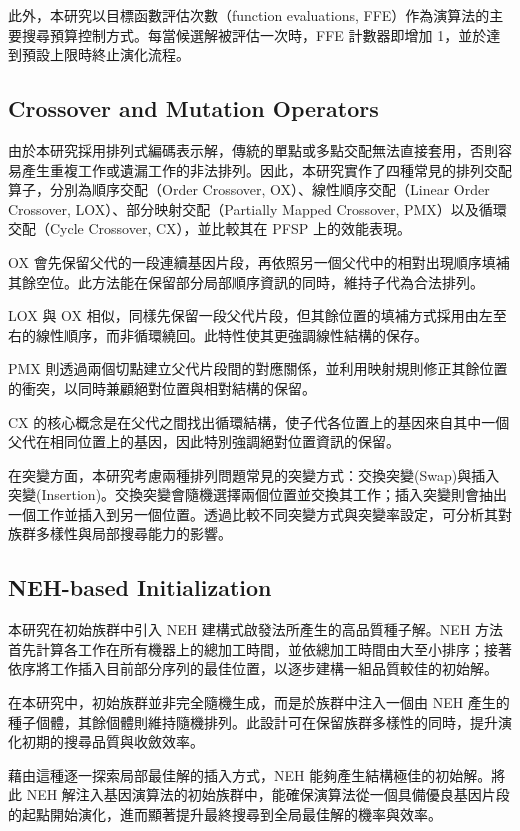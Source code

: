 \documentclass[conference]{IEEEtran}
\begin{document}
此外，本研究以目標函數評估次數（function evaluations, FFE）作為演算法的主要搜尋預算控制方式。每當候選解被評估一次時，FFE 計數器即增加 1，並於達到預設上限時終止演化流程。
\subsection{Crossover and Mutation Operators}
由於本研究採用排列式編碼表示解，傳統的單點或多點交配無法直接套用，否則容易產生重複工作或遺漏工作的非法排列。因此，本研究實作了四種常見的排列交配算子，分別為順序交配（Order Crossover, OX）、線性順序交配（Linear Order Crossover, LOX）、部分映射交配（Partially Mapped Crossover, PMX）以及循環交配（Cycle Crossover, CX），並比較其在 PFSP 上的效能表現。

OX 會先保留父代的一段連續基因片段，再依照另一個父代中的相對出現順序填補其餘空位。此方法能在保留部分局部順序資訊的同時，維持子代為合法排列。

LOX 與 OX 相似，同樣先保留一段父代片段，但其餘位置的填補方式採用由左至右的線性順序，而非循環繞回。此特性使其更強調線性結構的保存。

PMX 則透過兩個切點建立父代片段間的對應關係，並利用映射規則修正其餘位置的衝突，以同時兼顧絕對位置與相對結構的保留。

CX 的核心概念是在父代之間找出循環結構，使子代各位置上的基因來自其中一個父代在相同位置上的基因，因此特別強調絕對位置資訊的保留。

在突變方面，本研究考慮兩種排列問題常見的突變方式：交換突變(Swap)與插入突變(Insertion)。交換突變會隨機選擇兩個位置並交換其工作；插入突變則會抽出一個工作並插入到另一個位置。透過比較不同突變方式與突變率設定，可分析其對族群多樣性與局部搜尋能力的影響。

\subsection{NEH-based Initialization}
本研究在初始族群中引入 NEH 建構式啟發法所產生的高品質種子解。NEH 方法首先計算各工作在所有機器上的總加工時間，並依總加工時間由大至小排序；接著依序將工作插入目前部分序列的最佳位置，以逐步建構一組品質較佳的初始解。

在本研究中，初始族群並非完全隨機生成，而是於族群中注入一個由 NEH 產生的種子個體，其餘個體則維持隨機排列。此設計可在保留族群多樣性的同時，提升演化初期的搜尋品質與收斂效率。

藉由這種逐一探索局部最佳解的插入方式，NEH 能夠產生結構極佳的初始解。將此 NEH 解注入基因演算法的初始族群中，能確保演算法從一個具備優良基因片段的起點開始演化，進而顯著提升最終搜尋到全局最佳解的機率與效率。
\end{document}

